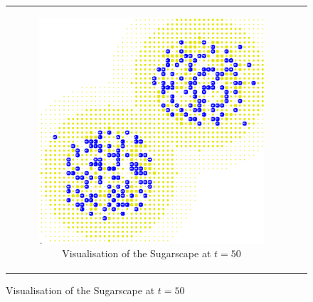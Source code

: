 \documentclass{bmcart}
\begin{document}
\begin{backmatter}
\begin{figure}[h!]
\begin{center}
	\begin{tabular}{c c}
		\begin{subfigure}[b]{0.5\textwidth}
			\centering
			\includegraphics[width=1\textwidth, angle=0]{./sugarscape_environment.png}
			\caption{Visualisation of the Sugarscape at $t = 50$}
			\label{fig:vis_sugarscape_t50_environment}
		\end{subfigure}
    	
    	&
  

\end{tabular}
\end{center}
\end{figure}
\end{backmatter}
\end{document}
